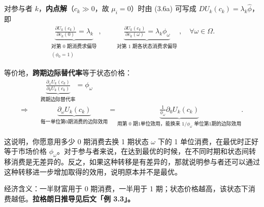 \begin{tcolorbox}[knowledge,title=3.4 参与者的优化]
对参与者 $k$，\textbf{内点解}（$c_k\gg 0$，故 $\mu_i=0$）时由 (3.6a) 可写成 $DU_k(c_k)=\lambda_k\hat{\phi}$，即
\begin{align}
    \underbrace{\frac{\partial U_k(c_k)}{\partial c_k(0)}=\lambda_k}_{\substack{\text{对第 0 期消费求偏导}\\(\phi_0=1)}},
    &\quad
    \underbrace{\frac{\partial U_k(c_k)}{\partial c_k(\omega)}=\lambda_k\phi_{\omega}}_{\substack{\text{对第 1 期各状态消费求偏导}}},\quad
    \forall\omega\in\Omega. \tag{3.7}
\end{align}

等价地，\textbf{跨期边际替代率}等于状态价格：
\[
\begin{aligned}
&\underbrace{\frac{\partial_{\omega}U_k(c_k)}{\partial_0 U_k(c_k)}}_{\text{跨期边际替代率}}=\phi_{\omega}\\ 
\Rightarrow \quad &\underbrace{\partial_{\omega}U_k(c_k)}_{\text{每一单位第0期消费的边际效用}}=\underbrace{\frac{1}{\phi_{\omega}}\partial_0 U_k(c_k)}_{\text{用第 0 期1单位效用，能换来 $1/\phi_{\omega}$ 单位第1期的边际效用}}.
\end{aligned}
\tag{3.8}
\]

这说明，你愿意用多少 0 期消费去换 1 期状态 $\omega$ 下的 1 单位消费，在最优时正好等于市场价格 $\phi_{\omega}$。对于参与者来说，在达到最优的时候，在不同时期和状态间转移消费是无差异的。反之，如果这种转移是有差异的，那就说明参与者还可以通过这种转移进一步增加取得的效用，说明原本并不是最优。

\end{tcolorbox}

\begin{tcolorbox}[example]
经济含义：一半财富用于 0 期消费，一半用于 1 期；状态价格越高，该状态下消费越低。\textbf{拉格朗日推导见后文「例 3.3」。}

\end{tcolorbox}

